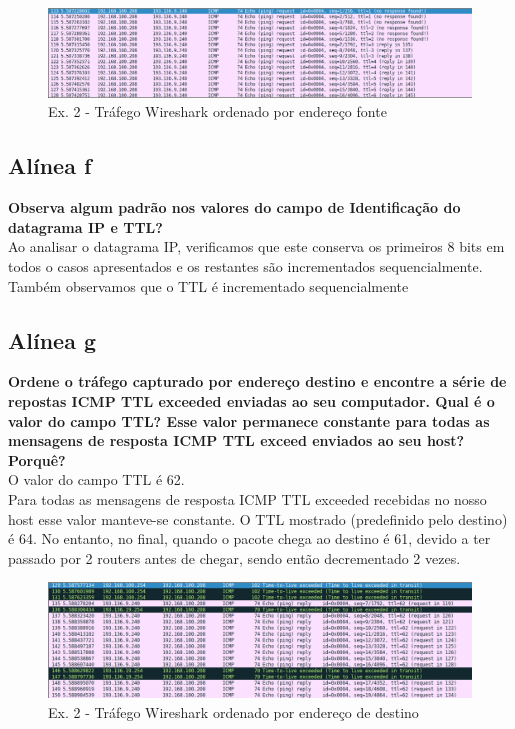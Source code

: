 \documentclass[a4paper]{report}
\begin{document}
\begin{figure}[H]
    \centering 
    \includegraphics[width=\textwidth]{images/wiresharkSourceEx2.png}
    \caption{Ex. 2 - Tráfego Wireshark ordenado por endereço fonte}
    \label{fig:wiresharkSourceEx2}
\end{figure}
\subsection{Alínea f}
\textbf{Observa algum padrão nos valores do campo de Identificação do datagrama
IP e TTL?}\\
Ao analisar o datagrama IP, verificamos que este conserva os primeiros 8 bits em
todos o casos apresentados e os restantes são incrementados sequencialmente.\\
Também observamos que o TTL é incrementado sequencialmente

\subsection{Alínea g}
\textbf{Ordene o tráfego capturado por endereço destino e encontre a 
série de repostas ICMP TTL exceeded enviadas ao seu computador. Qual é o
valor do campo TTL? Esse valor permanece constante para todas as mensagens 
de resposta ICMP TTL exceed enviados ao seu host? Porquê?}\\
O valor do campo TTL é 62.\\
Para todas as mensagens de resposta ICMP TTL exceeded recebidas no nosso host
esse valor manteve-se constante. O TTL mostrado (predefinido pelo destino) é 64.
No entanto, no final, quando o pacote chega ao destino é 61, devido a ter
passado por 2 routers antes de chegar, sendo então decrementado 2 vezes.

\begin{figure}[H]
    \centering 
    \includegraphics[width=\textwidth]{images/wiresharkDestinyEx2.png}
    \caption{Ex. 2 - Tráfego Wireshark ordenado por endereço de destino}
    \label{fig:wiresharkDestinyEx2}
\end{figure}
\end{document}
